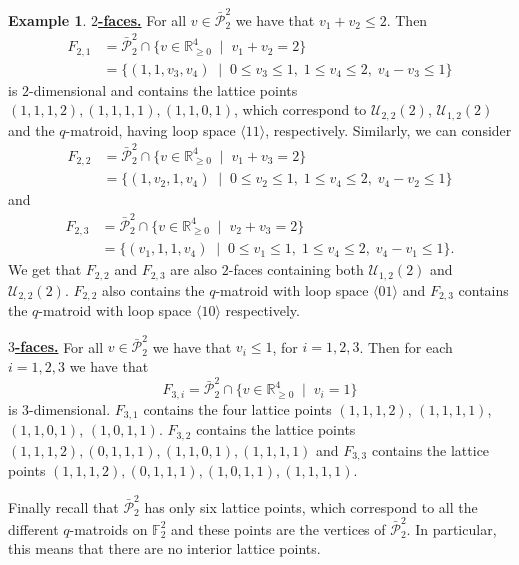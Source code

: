 \documentclass[a4paper,11pt,reqno]{amsart}
\theoremstyle{definition}
\newtheorem{example}[theorem]{{{Example}}}
\newcommand{\mU}{\mathcal{U}}
\newcommand{\F}{\mathbb F}
\newcommand{\la}{\langle}
\newcommand{\ra}{\rangle}
\begin{document}
{\begin{example}
    \noindent \underline{\textbf{$2$-faces.}} For all $v\in\bar{\mathcal{P}}_2^2$ we have that $v_1+v_2\leq 2$.
        Then
        \begin{align*}
            F_{2,1} &= \bar{\mathcal{P}}_2^2\cap\{v\in\mathbb{R}_{\geq 0}^4\;\mid\;v_1+v_2=2\}\\
            &=\{(1,1,v_3,v_4)\;\mid\; 0\leq v_3\leq 1,\;1\leq v_4\leq 2,\;v_4-v_3\leq 1\}
        \end{align*}
        is $2$-dimensional and contains the lattice points $(1,1,1,2),(1,1,1,1),(1,1,0,1)$, which correspond to $\mU_{2,2}(2)$, $\mU_{1,2}(2)$ and the $q$-matroid, having loop space $\la 11 \ra$, respectively.
        Similarly, we can consider 
        \begin{align*}
            F_{2,2} &= \bar{\mathcal{P}}_2^2\cap\{v\in\mathbb{R}_{\geq 0}^4\;\mid\;v_1+v_3=2\}\\
            &=\{(1,v_2,1,v_4)\;\mid\; 0\leq v_2\leq 1,\;1\leq v_4\leq 2,\;v_4-v_2\leq 1\}
        \end{align*}
        and 
        \begin{align*}
            F_{2,3} &= \bar{\mathcal{P}}_2^2\cap\{v\in\mathbb{R}_{\geq 0}^4\;\mid\;v_2+v_3=2\}\\
            &=\{(v_1,1,1,v_4)\;\mid \; 0\leq v_1\leq 1,\;1\leq v_4\leq 2,\;v_4-v_1\leq 1\}.
        \end{align*}
        We get that $F_{2,2}$ and $F_{2,3}$ are also $2$-faces containing both $\mU_{1,2}(2)$ and $\mU_{2,2}(2)$. 
        $F_{2,2}$ also contains the $q$-matroid with loop space $\la 01 \ra$ and $F_{2,3}$ contains the $q$-matroid with loop space $\la 10 \ra$ respectively. 
        


    \noindent \underline{\textbf{$3$-faces.}} For all $v\in\bar{\mathcal{P}}_2^2$ we have that $v_i\leq 1$, for $i=1,2,3$.
        Then for each $i=1,2,3$ we have that
        \[
            F_{3,i} = \bar{\mathcal{P}}_2^2\cap\{v\in\mathbb{R}_{\geq 0}^4\;\mid\;v_i=1\}
        \]
        is $3$-dimensional. $F_{3,1}$ contains the four lattice points $(1,1,1,2)$, $(1,1,1,1)$, $(1,1,0,1)$, $(1,0,1,1)$. $F_{3,2}$ contains the lattice points $(1,1,1,2), (0,1,1,1), (1,1,0,1), (1,1,1,1)$ and $F_{3,3}$ contains the lattice points $(1,1,1,2), (0,1,1,1), (1,0,1,1), (1,1,1,1)$. 
        
    Finally recall that $\bar{\mathcal{P}}_2^2$ has only six lattice points, which correspond to all the different $q$-matroids on $\F_2^2$ and these points are the vertices of $\bar{\mathcal{P}}_2^2$. In particular, this means that there are no interior lattice points.  
\end{example}

}
\end{document}
